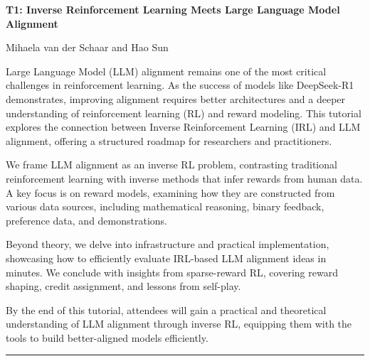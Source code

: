 \begin{center}
    \Large{\textbf{T1: Inverse Reinforcement Learning Meets Large Language Model Alignment}\\}
    \par\bigskip
    \large{Mihaela van der Schaar and Hao Sun}\\
    \par\bigskip

\end{center}

Large Language Model (LLM) alignment remains one of the most critical challenges in reinforcement learning. As the success of models like DeepSeek-R1 demonstrates, improving alignment requires better architectures and a deeper understanding of reinforcement learning (RL) and reward modeling. This tutorial explores the connection between Inverse Reinforcement Learning (IRL) and LLM alignment, offering a structured roadmap for researchers and practitioners.

We frame LLM alignment as an inverse RL problem, contrasting traditional reinforcement learning with inverse methods that infer rewards from human data. A key focus is on reward models, examining how they are constructed from various data sources, including mathematical reasoning, binary feedback, preference data, and demonstrations.

Beyond theory, we delve into infrastructure and practical implementation, showcasing how to efficiently evaluate IRL-based LLM alignment ideas in minutes. We conclude with insights from sparse-reward RL, covering reward shaping, credit assignment, and lessons from self-play.

By the end of this tutorial, attendees will gain a practical and theoretical understanding of LLM alignment through inverse RL, equipping them with the tools to build better-aligned models efficiently.

\begin{center}
    \noindent\rule{200px}{1pt}
\end{center}
